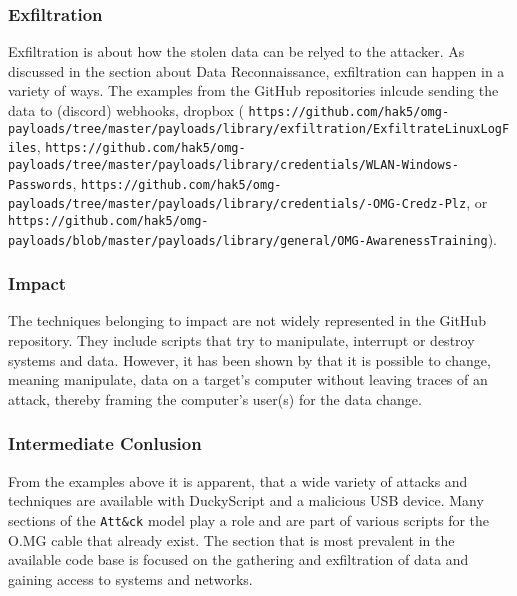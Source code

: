 \subsubsection{Exfiltration}

Exfiltration is about how the stolen data can be relyed to the attacker. As discussed in the section about Data Reconnaissance, exfiltration can happen in a variety of ways. The examples from the GitHub repositories inlcude sending the data to (discord) webhooks, dropbox  ( \verb|https://github.com/hak5/omg-payloads/tree/master/payloads/library/exfiltration/ExfiltrateLinuxLogFiles|, \verb|https://github.com/hak5/omg-payloads/tree/master/payloads/library/credentials/WLAN-Windows-Passwords|, \verb|https://github.com/hak5/omg-payloads/tree/master/payloads/library/credentials/-OMG-Credz-Plz|, or \verb|https://github.com/hak5/omg-payloads/blob/master/payloads/library/general/OMG-AwarenessTraining|).

\subsubsection{Impact}

The techniques belonging to impact are not widely represented in the GitHub repository. They include scripts that try to manipulate, interrupt or destroy systems and data. However, it has been shown by \cite{lawalFacilitatingCyberenabledFraud2022} that it is possible to change, meaning manipulate, data on a target's computer without leaving traces of an attack, thereby framing the computer's user(s) for the data change. 


\subsubsection{Intermediate Conlusion}

From the examples above it is apparent, that a wide variety of attacks and techniques are available with DuckyScript and a malicious USB device. Many sections of the \verb|Att&ck| model play a role and are part of various scripts for the O.MG cable that already exist. The section that is most prevalent in the available code base is focused on the gathering and exfiltration of data and gaining access to systems and networks. 